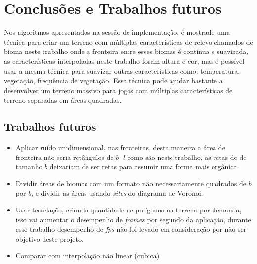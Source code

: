 \chapter{Conclusões e Trabalhos futuros}
Nos algoritmos apresentados na sessão de implementação, é mostrado uma técnica para 
criar um terreno com múltiplas características de relevo chamados de bioma neste trabalho
onde a fronteira entre esses biomas é contínua e suavizada, as características interpoladas
neste trabalho foram altura e cor, mas é possível usar a mesma técnica para suavizar
outras características como: temperatura, vegetação, frequência de vegetação.
Essa técnica pode ajudar bastante a desenvolver um terreno massivo para jogos com
múltiplas características de terreno separadas em áreas quadradas.

\section{Trabalhos futuros}

\begin{itemize}
    \item Aplicar ruído unidimensional, nas fronteiras, desta maneira a área de fronteira
    não seria retângulos de $b \cdot l$ como são neste trabalho, as retas de de tamanho
    $b$ deixariam de ser retas para assumir uma forma mais orgânica.
    \item Dividir áreas de biomas com um formato não necessariamente quadrados de $b$ por $b$, 
    e dividir as áreas usando \textit{sites} do diagrama de Voronoi.
    \item Usar tesselação, criando quantidade de polígonos no terreno por demanda, 
    isso vai aumentar o desempenho de \textit{frames} por segundo da aplicação, durante esse trabalho 
    desempenho de \textit{fps} não foi levado em consideração por não ser objetivo deste projeto.
    \item Comparar com interpolação não linear (cubica)
    
\end{itemize}